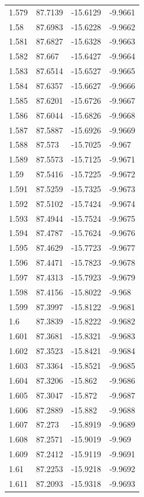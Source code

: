 \begin{tabular}{llll}
1.579 & 87.7139 & -15.6129 & -9.9661 \\
1.58 & 87.6983 & -15.6228 & -9.9662 \\
1.581 & 87.6827 & -15.6328 & -9.9663 \\
1.582 & 87.667 & -15.6427 & -9.9664 \\
1.583 & 87.6514 & -15.6527 & -9.9665 \\
1.584 & 87.6357 & -15.6627 & -9.9666 \\
1.585 & 87.6201 & -15.6726 & -9.9667 \\
1.586 & 87.6044 & -15.6826 & -9.9668 \\
1.587 & 87.5887 & -15.6926 & -9.9669 \\
1.588 & 87.573 & -15.7025 & -9.967 \\
1.589 & 87.5573 & -15.7125 & -9.9671 \\
1.59 & 87.5416 & -15.7225 & -9.9672 \\
1.591 & 87.5259 & -15.7325 & -9.9673 \\
1.592 & 87.5102 & -15.7424 & -9.9674 \\
1.593 & 87.4944 & -15.7524 & -9.9675 \\
1.594 & 87.4787 & -15.7624 & -9.9676 \\
1.595 & 87.4629 & -15.7723 & -9.9677 \\
1.596 & 87.4471 & -15.7823 & -9.9678 \\
1.597 & 87.4313 & -15.7923 & -9.9679 \\
1.598 & 87.4156 & -15.8022 & -9.968 \\
1.599 & 87.3997 & -15.8122 & -9.9681 \\
1.6 & 87.3839 & -15.8222 & -9.9682 \\
1.601 & 87.3681 & -15.8321 & -9.9683 \\
1.602 & 87.3523 & -15.8421 & -9.9684 \\
1.603 & 87.3364 & -15.8521 & -9.9685 \\
1.604 & 87.3206 & -15.862 & -9.9686 \\
1.605 & 87.3047 & -15.872 & -9.9687 \\
1.606 & 87.2889 & -15.882 & -9.9688 \\
1.607 & 87.273 & -15.8919 & -9.9689 \\
1.608 & 87.2571 & -15.9019 & -9.969 \\
1.609 & 87.2412 & -15.9119 & -9.9691 \\
1.61 & 87.2253 & -15.9218 & -9.9692 \\
1.611 & 87.2093 & -15.9318 & -9.9693 \\

\end{tabular}
